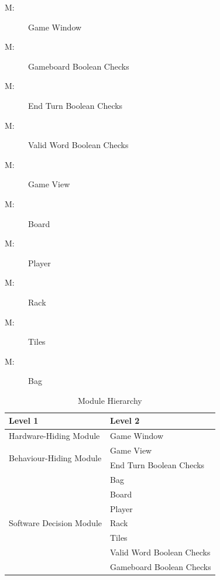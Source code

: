 \documentclass[12pt, titlepage]{article}
\newcounter{mnum}
\newcommand{\mthemnum}{M\themnum}
\begin{document}
\begin{description}
\item [ \mthemnum \label{mHHGW}:] Game Window %
\item [ \mthemnum \label{mBHGB}:] Gameboard Boolean Checks %
\item [ \mthemnum \label{mBHET}:] End Turn Boolean Checks %
\item [ \mthemnum \label{mBHVW}:] Valid Word Boolean Checks %
\item [ \mthemnum \label{mBHGV}:] Game View %
\item [ \mthemnum \label{mSDBO}:] Board %
\item [ \mthemnum \label{mSDP}:] Player %
\item [ \mthemnum \label{mSDR}:] Rack %
\item [ \mthemnum \label{mSDT}:] Tiles %
\item [ \mthemnum \label{mSDB}:] Bag %
\end{description}


\begin{table}[h!]
\centering
\begin{tabular}{p{} p{}}
\toprule
\textbf{Level 1} & \textbf{Level 2}\\
\midrule

{Hardware-Hiding Module} & Game Window \\
\midrule

\multirow{2}{0.3\textwidth}{Behaviour-Hiding Module} & Game View\\
& End Turn Boolean Checks\\

\midrule

\multirow{7}{0.3\textwidth}{Software Decision Module} & Bag\\
& Board\\
& Player\\
& Rack\\
& Tiles\\
& Valid Word Boolean Checks\\
& Gameboard Boolean Checks\\
\bottomrule

\end{tabular}
\caption{Module Hierarchy}
\label{TblMH}
\end{table}
\end{document}
